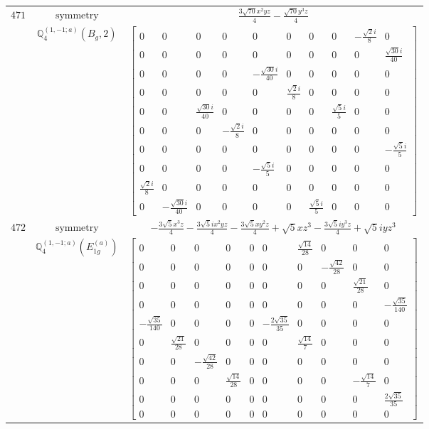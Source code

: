 \documentclass[fleqn,8pt,landscape]{jsarticle}
\begin{document}
\begin{longtable}{ccc}
$ 471 $ & $ \text{symmetry} $ & $ \frac{3 \sqrt{70} x^{2} y z}{4} - \frac{\sqrt{70} y^{3} z}{4} $ \\
$  $ & $ \mathbb{Q}_{4}^{(1,-1;a)}(B_{g},2) $ & $ \begin{bmatrix} 0 & 0 & 0 & 0 & 0 & 0 & 0 & 0 & - \frac{\sqrt{2} i}{8} & 0 \\ 0 & 0 & 0 & 0 & 0 & 0 & 0 & 0 & 0 & \frac{\sqrt{30} i}{40} \\ 0 & 0 & 0 & 0 & - \frac{\sqrt{30} i}{40} & 0 & 0 & 0 & 0 & 0 \\ 0 & 0 & 0 & 0 & 0 & \frac{\sqrt{2} i}{8} & 0 & 0 & 0 & 0 \\ 0 & 0 & \frac{\sqrt{30} i}{40} & 0 & 0 & 0 & 0 & \frac{\sqrt{5} i}{5} & 0 & 0 \\ 0 & 0 & 0 & - \frac{\sqrt{2} i}{8} & 0 & 0 & 0 & 0 & 0 & 0 \\ 0 & 0 & 0 & 0 & 0 & 0 & 0 & 0 & 0 & - \frac{\sqrt{5} i}{5} \\ 0 & 0 & 0 & 0 & - \frac{\sqrt{5} i}{5} & 0 & 0 & 0 & 0 & 0 \\ \frac{\sqrt{2} i}{8} & 0 & 0 & 0 & 0 & 0 & 0 & 0 & 0 & 0 \\ 0 & - \frac{\sqrt{30} i}{40} & 0 & 0 & 0 & 0 & \frac{\sqrt{5} i}{5} & 0 & 0 & 0 \end{bmatrix} $ \\ \hline
$ 472 $ & $ \text{symmetry} $ & $ - \frac{3 \sqrt{5} x^{3} z}{4} - \frac{3 \sqrt{5} i x^{2} y z}{4} - \frac{3 \sqrt{5} x y^{2} z}{4} + \sqrt{5} x z^{3} - \frac{3 \sqrt{5} i y^{3} z}{4} + \sqrt{5} i y z^{3} $ \\
$  $ & $ \mathbb{Q}_{4}^{(1,-1;a)}(E_{1g}^{(a)}) $ & $ \begin{bmatrix} 0 & 0 & 0 & 0 & 0 & 0 & \frac{\sqrt{14}}{28} & 0 & 0 & 0 \\ 0 & 0 & 0 & 0 & 0 & 0 & 0 & - \frac{\sqrt{42}}{28} & 0 & 0 \\ 0 & 0 & 0 & 0 & 0 & 0 & 0 & 0 & \frac{\sqrt{21}}{28} & 0 \\ 0 & 0 & 0 & 0 & 0 & 0 & 0 & 0 & 0 & - \frac{\sqrt{35}}{140} \\ - \frac{\sqrt{35}}{140} & 0 & 0 & 0 & 0 & - \frac{2 \sqrt{35}}{35} & 0 & 0 & 0 & 0 \\ 0 & \frac{\sqrt{21}}{28} & 0 & 0 & 0 & 0 & \frac{\sqrt{14}}{7} & 0 & 0 & 0 \\ 0 & 0 & - \frac{\sqrt{42}}{28} & 0 & 0 & 0 & 0 & 0 & 0 & 0 \\ 0 & 0 & 0 & \frac{\sqrt{14}}{28} & 0 & 0 & 0 & 0 & - \frac{\sqrt{14}}{7} & 0 \\ 0 & 0 & 0 & 0 & 0 & 0 & 0 & 0 & 0 & \frac{2 \sqrt{35}}{35} \\ 0 & 0 & 0 & 0 & 0 & 0 & 0 & 0 & 0 & 0 \end{bmatrix} $ \\ \hline

\end{longtable}
\end{document}
